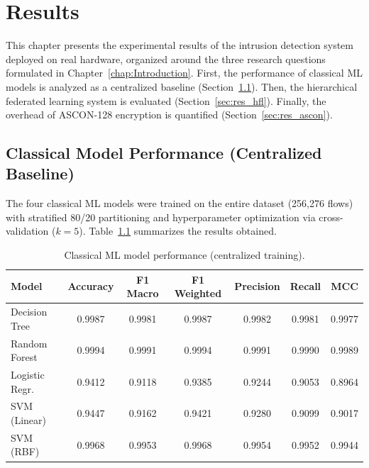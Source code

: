\chapter{Results}
\label{chap:resu}

This chapter presents the experimental results of the intrusion detection system deployed on real hardware, organized around the three research questions formulated in Chapter~\ref{chap:Introduction}. First, the performance of classical ML models is analyzed as a centralized baseline (Section~\ref{sec:res_classic}). Then, the hierarchical federated learning system is evaluated (Section~\ref{sec:res_hfl}). Finally, the overhead of ASCON-128 encryption is quantified (Section~\ref{sec:res_ascon}).

\section{Classical Model Performance (Centralized Baseline)}
\label{sec:res_classic}

The four classical ML models were trained on the entire dataset (256,276 flows) with stratified 80/20 partitioning and hyperparameter optimization via cross-validation ($k=5$). Table~\ref{tab:classic_results} summarizes the results obtained.

\begin{table}[H]
\centering
\caption{Classical ML model performance (centralized training).}
\label{tab:classic_results}
\small
\begin{tabular}{l c c c c c c}
\toprule
\textbf{Model} & \textbf{Accuracy} & \textbf{F1 Macro} & \textbf{F1 Weighted} & \textbf{Precision} & \textbf{Recall} & \textbf{MCC} \\
\midrule
Decision Tree      & 0.9987 & 0.9981 & 0.9987 & 0.9982 & 0.9981 & 0.9977 \\
Random Forest      & 0.9994 & 0.9991 & 0.9994 & 0.9991 & 0.9990 & 0.9989 \\
Logistic Regr.     & 0.9412 & 0.9118 & 0.9385 & 0.9244 & 0.9053 & 0.8964 \\
SVM (Linear)       & 0.9447 & 0.9162 & 0.9421 & 0.9280 & 0.9099 & 0.9017 \\
SVM (RBF)          & 0.9968 & 0.9953 & 0.9968 & 0.9954 & 0.9952 & 0.9944 \\
\bottomrule
\end{tabular}
\end{table}

